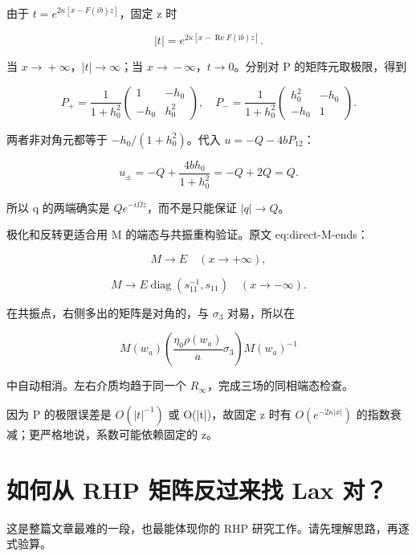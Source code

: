 由于 $t=e^{2\kappa{}[x-F(ib)z]}$，固定 z 时\par

\[
|t|=e^{2\kappa[x-\operatorname{Re}F(\mathrm{i}b)z]}.
\]

当 $x\to{}+\infty{}$，$|t|\to{}\infty{}$；当 $x\to{}-\infty{}$，$t\to{}0$。分别对 P 的矩阵元取极限，得到\par

\[
P_+=\dfrac{1}{1+h_0^2}
\begin{pmatrix}1&-h_0\\-h_0&h_0^2\end{pmatrix},
\quad
P_-=\dfrac{1}{1+h_0^2}
\begin{pmatrix}h_0^2&-h_0\\-h_0&1\end{pmatrix}.
\]

两者非对角元都等于 $-h_{0}/(1+h_{0}^{2})$。代入 $u=-Q-4bP_{12}$：\par

\[
u_\pm=-Q+\dfrac{4bh_0}{1+h_0^2}
=-Q+2Q=Q.
\]

所以 q 的两端确实是 $Qe^{-i\Omega{}z}$，而不是只能保证 $|q|\to{}Q$。\par

极化和反转更适合用 M 的端态与共振重构验证。原文 eq:direct-M-ends：\par

\[
M\to E\quad(x\to+\infty),
\]

\[
M\to E\operatorname{diag}(s_{11}^{-1},s_{11})
\quad(x\to-\infty).
\]

在共振点，右侧多出的矩阵是对角的，与 $\sigma{}_{3}$ 对易，所以在\par

\[
M(w_a)\left(\dfrac{\eta_0\rho(w_a)}{a}\sigma_3\right)M(w_a)^{-1}
\]

中自动相消。左右介质均趋于同一个 $R_{\infty}$，完成三场的同相端态检查。\par

因为 P 的极限误差是 $O(|t|^{-1})$ 或 O(|t|)，故固定 z 时有 $O(e^{-2\kappa{}|x|})$ 的指数衰减；更严格地说，系数可能依赖固定的 z。\par

\section{如何从 RHP 矩阵反过来找 Lax 对？}
\par

这是整篇文章最难的一段，也最能体现你的 RHP 研究工作。请先理解思路，再逐式验算。\par

